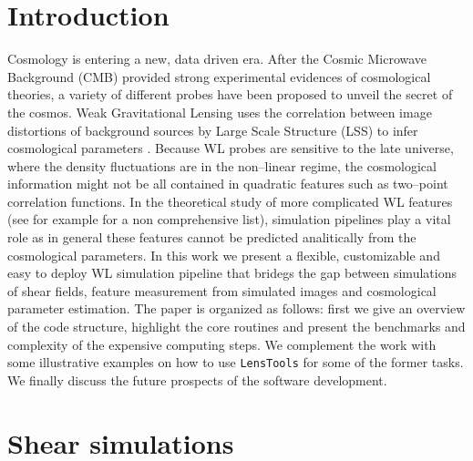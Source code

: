 \documentclass[reprint,aps,prd,superscriptaddress,showkeys,showpacs]{revtex4-1}
\newcommand{\LT}{\texttt{LensTools} }
\begin{document}
\section{Introduction}
%
Cosmology is entering a new, data driven era. After the Cosmic Microwave Background (CMB) \citep{WMAP,PlanckXVI2013} provided strong experimental evidences of cosmological theories, a variety of different probes have been proposed to unveil the secret of the cosmos. Weak Gravitational Lensing uses the correlation between image distortions of background sources by Large Scale Structure (LSS) to infer cosmological parameters \citep{WLprimer}. Because WL probes are sensitive to the late universe, where the density fluctuations are in the non--linear regime, the cosmological information might not be all contained in quadratic features such as two--point correlation functions. In the theoretical study of more complicated WL features (see for example \citep{3pcf1,bispectrum1,moments1,peaks1} for a non comprehensive list), simulation pipelines play a vital role as in general these features cannot be predicted analitically from the cosmological parameters. In this work we present a flexible, customizable and easy to deploy WL simulation pipeline that bridegs the gap between simulations of shear fields, feature measurement from simulated images and cosmological parameter estimation. The paper is organized as follows: first we give an overview of the code structure, highlight the core routines and present the benchmarks and complexity of the expensive computing steps. We complement the work with some illustrative examples on how to use \LT for some of the former tasks. We finally discuss the future prospects of the software development.     


\section{Shear simulations} 
\end{document}
